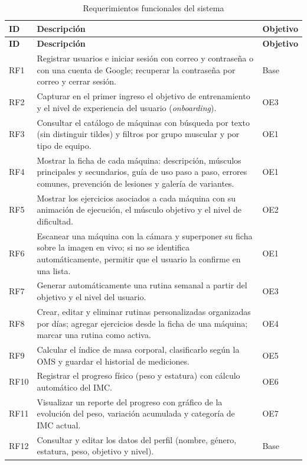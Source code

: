 \begin{longtable}{|L{1.1cm}|L{10.0cm}|C{1.9cm}|}
\caption{Requerimientos funcionales del sistema}
\label{tab:rf}\\
\hline
{} \textbf{ID} & \textbf{Descripción} & \textbf{Objetivo} \\
\hline
\endfirsthead
\hline
{} \textbf{ID} & \textbf{Descripción} & \textbf{Objetivo} \\
\hline
\endhead

\endfoot
RF1 & Registrar usuarios e iniciar sesión con correo y contraseña o con una
cuenta de Google; recuperar la contraseña por correo y cerrar sesión. & Base \\ \hline
RF2 & Capturar en el primer ingreso el objetivo de entrenamiento y el nivel de
experiencia del usuario (\emph{onboarding}). & OE3 \\ \hline
RF3 & Consultar el catálogo de máquinas con búsqueda por texto (sin
distinguir tildes) y filtros por grupo muscular y por tipo de equipo. & OE1 \\ \hline
RF4 & Mostrar la ficha de cada máquina: descripción, músculos principales y
secundarios, guía de uso paso a paso, errores comunes, prevención de lesiones
y galería de variantes. & OE1 \\ \hline
RF5 & Mostrar los ejercicios asociados a cada máquina con su animación de
ejecución, el músculo objetivo y el nivel de dificultad. & OE2 \\ \hline
RF6 & Escanear una máquina con la cámara y superponer su ficha sobre la imagen
en vivo; si no se identifica automáticamente, permitir que el usuario la
confirme en una lista. & OE1 \\ \hline
RF7 & Generar automáticamente una rutina semanal a partir del objetivo y el
nivel del usuario. & OE3 \\ \hline
RF8 & Crear, editar y eliminar rutinas personalizadas organizadas por días;
agregar ejercicios desde la ficha de una máquina; marcar una rutina como
activa. & OE4 \\ \hline
RF9 & Calcular el índice de masa corporal, clasificarlo según la OMS y guardar
el historial de mediciones. & OE5 \\ \hline
RF10 & Registrar el progreso físico (peso y estatura) con cálculo automático
del IMC. & OE6 \\ \hline
RF11 & Visualizar un reporte del progreso con gráfico de la evolución del
peso, variación acumulada y categoría de IMC actual. & OE7 \\ \hline
RF12 & Consultar y editar los datos del perfil (nombre, género, estatura,
peso, objetivo y nivel). & Base \\ \hline
\end{longtable}

